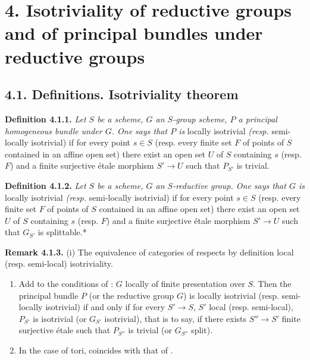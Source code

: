 
\section*{4. Isotriviality of reductive groups and of principal bundles under reductive groups}

\subsection*{4.1. Definitions. Isotriviality theorem}

\textbf{Definition 4.1.1.} \emph{Let \(S\) be a scheme, \(G\) an \(S\)-group scheme, \(P\) a principal homogeneous bundle under \(G\). One
says that \(P\) is} locally isotrivial \emph{(resp.} semi-locally isotrivial) if for every point \(s \in S\) (resp. every
finite set \(F\) of points of \(S\) contained in an affine open set) there exist an open set \(U\) of \(S\) containing \(s\)
(resp. \(F\)) and a finite surjective étale morphism \(S' \to U\) such that \(P_{S'}\) is trivial.

\textbf{Definition 4.1.2.} \emph{Let \(S\) be a scheme, \(G\) an \(S\)-reductive group. One says that \(G\) is} locally isotrivial
\emph{(resp.} semi-locally isotrivial) if for every point \(s \in S\) (resp. every finite set \(F\) of points of \(S\) contained
in an affine open set) there exist an open set \(U\) of \(S\) containing \(s\) (resp. \(F\)) and a finite surjective étale
morphism \(S' \to U\) such that \(G_{S'}\) is splittable.*

\textbf{Remark 4.1.3.} (i) The equivalence of categories of  respects by definition local (resp. semi-local)
isotriviality.

\begin{enumerate}
\def\labelenumi{(\roman{enumi})}
\setcounter{enumi}{1}
\item
  Add to the conditions of : \(G\) locally of finite presentation over \(S\). Then the principal bundle \(P\) (or the
  reductive group \(G\)) is locally isotrivial (resp. semi-locally isotrivial) if and only if for every \(S' \to S\), \(S'\)
  local (resp. semi-local), \(P_{S'}\) is isotrivial (or \(G_{S'}\) isotrivial), that is to say, if there exists \(S'' \to S'\)
  finite surjective étale such that \(P_{S''}\) is trivial (or \(G_{S''}\) split).
\item
  In the case of tori,  coincides with that of .
\end{enumerate}

